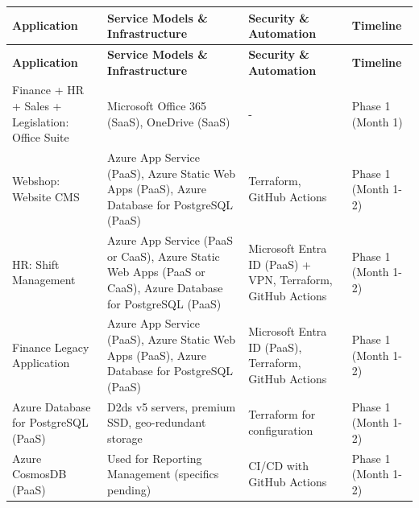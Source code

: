 \documentclass{llncs}
\begin{document}
\begin{longtable}{|p{3.1cm}|p{5.2cm}|p{3.1cm}|l|}
    \hline
    \textbf{Application}                              & \textbf{Service Models \& Infrastructure}                                                                    & \textbf{Security \& Automation}                            & \textbf{Timeline}    \\
    \hline
    \endfirsthead
    \hline
    \textbf{Application}                              & \textbf{Service Models \& Infrastructure}                                                                    & \textbf{Security \& Automation}                            & \textbf{Timeline}    \\
    \hline
    \endhead
    \hline
    \endfoot
    \hline

    Finance + HR + Sales + Legislation: Office Suite  & Microsoft Office 365 (SaaS), OneDrive (SaaS)                                                                 & -                                                          & Phase 1 (Month 1)    \\
    \hline
    Webshop: Website CMS                              & Azure App Service (PaaS), Azure Static Web Apps (PaaS), Azure Database for PostgreSQL (PaaS)                 & Terraform, GitHub Actions                                  & Phase 1 (Month 1-2)  \\
    \hline
    HR: Shift Management                              & Azure App Service (PaaS or CaaS), Azure Static Web Apps (PaaS or CaaS), Azure Database for PostgreSQL (PaaS) & Microsoft Entra ID (PaaS) + VPN, Terraform, GitHub Actions & Phase 1 (Month 1-2)  \\
    \hline
    Finance Legacy Application                        & Azure App Service (PaaS), Azure Static Web Apps (PaaS), Azure Database for PostgreSQL (PaaS)                 & Microsoft Entra ID (PaaS), Terraform, GitHub Actions       & Phase 1 (Month 1-2)  \\
    \hline
    Azure Database for PostgreSQL (PaaS)              & D2ds v5 servers, premium SSD, geo-redundant storage                                                          & Terraform for configuration                                & Phase 1 (Month 1-2)  \\
    \hline
    Azure CosmosDB (PaaS)                             & Used for Reporting Management (specifics pending)                                                            & CI/CD with GitHub Actions                                  & Phase 1 (Month 1-2)  \\

\end{longtable}
\end{document}

